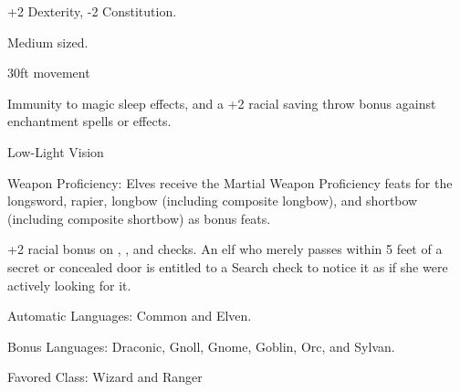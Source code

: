 

\begin{itemize*}
\item +2 Dexterity, -2 Constitution.
\item Medium sized.
\item 30ft movement
\item Immunity to magic sleep effects, and a +2 racial saving throw bonus against enchantment spells or effects.
\item Low-Light Vision
\item Weapon Proficiency: Elves receive the Martial Weapon Proficiency feats for the longsword, rapier, longbow (including composite longbow), and shortbow (including composite shortbow) as bonus feats.
\item +2 racial bonus on , , and  checks. An elf who merely passes within 5 feet of a secret or concealed door is entitled to a Search check to notice it as if she were actively looking for it.
\item Automatic Languages: Common and Elven.
\item Bonus Languages: Draconic, Gnoll, Gnome, Goblin, Orc, and Sylvan.
\item Favored Class: Wizard and Ranger
\end{itemize*}
